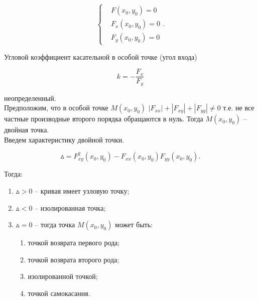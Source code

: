                         \[
                            \begin{cases}
                                & F \left( x_{0}, y_{0} \right) = 0\\
                                & F_{x} \left( x_{0}, y_{0} \right) = 0\\
                                & F_{y} \left( x_{0}, y_{0} \right) = 0
                           \end{cases}.
                        \]

                    Угловой коэффициент касательной в особой точке (угол входа)

                        \[
                            k = - \frac{F_{x}}{F_{y}}
                        \]

                    неопределенный.\\

                    Предположим, что в особой точке $M \left( x_{0}, y_{0} \right)$ $\left| F_{xx} \right| + \left| F_{xy} \right| + \left| F_{yy} \right| \neq 0$ т.е. не все частные производные второго порядка обращаются в нуль. Тогда $M \left( x_{0}, y_{0} \right)$ -- двойная точка.\\

                    Введем характеристику двойной точки.

                        \[
                            \vartriangle = F^{2}_{xy} \left( x_{0}, y_{0} \right) - F_{xx} \left( x_{0}, y_{0} \right) F_{yy} \left( x_{0}, y_{0} \right).
                        \]

                    Тогда:

                        \begin{enumerate}
                            \item $\vartriangle > 0$ -- кривая имеет узловую точку;

                            \item $\vartriangle < 0$ -- изолированная точка;

                            \item $\vartriangle = 0$ -- тогда точка $M \left( x_{0}, y_{0} \right)$ может быть:

                            \begin{enumerate}
                                \item точкой возврата первого рода;

                                \item точкой возврата второго рода;

                                \item изолированной точкой;

                                \item точкой самокасания. 
                            \end{enumerate}
                        \end{enumerate}

